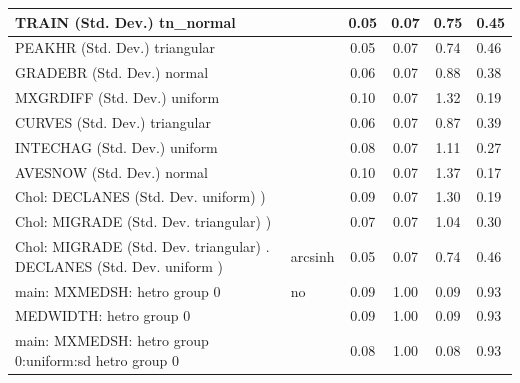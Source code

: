 \begin{table}
\begin{center}
\begin{tabular}{|l|l|c|c|c|l|}
			\hline
			TRAIN (Std. Dev.) tn_normal &  & 0.05 & 0.07 & 0.75 & 0.45 \\
			\hline
			PEAKHR (Std. Dev.) triangular &  & 0.05 & 0.07 & 0.74 & 0.46 \\
			\hline
			GRADEBR (Std. Dev.) normal &  & 0.06 & 0.07 & 0.88 & 0.38 \\
			\hline
			MXGRDIFF (Std. Dev.) uniform &  & 0.10 & 0.07 & 1.32 & 0.19 \\
			\hline
			CURVES (Std. Dev.) triangular &  & 0.06 & 0.07 & 0.87 & 0.39 \\
			\hline
			INTECHAG (Std. Dev.) uniform &  & 0.08 & 0.07 & 1.11 & 0.27 \\
			\hline
			AVESNOW (Std. Dev.) normal &  & 0.10 & 0.07 & 1.37 & 0.17 \\
			\hline
			 Chol: DECLANES (Std. Dev. uniform) ) &  & 0.09 & 0.07 & 1.30 & 0.19 \\
			\hline
			 Chol: MIGRADE (Std. Dev. triangular) ) &  & 0.07 & 0.07 & 1.04 & 0.30 \\
			\hline
			 Chol: MIGRADE (Std. Dev. triangular) . DECLANES (Std. Dev.   uniform ) & arcsinh & 0.05 & 0.07 & 0.74 & 0.46 \\
			\hline
			main: MXMEDSH: hetro group 0 & no & 0.09 & 1.00 & 0.09 & 0.93 \\
			\hline
			MEDWIDTH: hetro group 0 &  & 0.09 & 1.00 & 0.09 & 0.93 \\
			\hline
			main: MXMEDSH: hetro group 0:uniform:sd  hetro group 0 &  & 0.08 & 1.00 & 0.08 & 0.93 \\
			\hline
		\end{tabular}
	\end{center}
\end{table}
